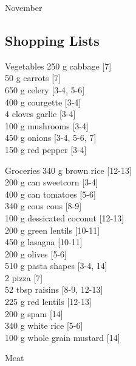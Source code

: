 \begin{menu}{November}
    \subsection*{Shopping Lists}
      \begin{shoppinglist}{Vegetables}
      250 g cabbage {\scriptsize[7]}\\
      50 g carrots {\scriptsize[7]}\\
      650 g celery {\scriptsize[3-4, 5-6]}\\
      400 g courgette {\scriptsize[3-4]}\\
      4 cloves garlic {\scriptsize[3-4]}\\
      100 g mushrooms {\scriptsize[3-4]}\\
      450 g onions {\scriptsize[3-4, 5-6, 7]}\\
      150 g red pepper {\scriptsize[3-4]}\\
      \end{shoppinglist}%
      \begin{shoppinglist}{Groceries}
      340 g brown rice {\scriptsize[12-13]}\\
      200 g can sweetcorn {\scriptsize[3-4]}\\
      400 g can tomatoes {\scriptsize[5-6]}\\
      340 g cous cous {\scriptsize[8-9]}\\
      100 g dessicated coconut {\scriptsize[12-13]}\\
      200 g green lentils {\scriptsize[10-11]}\\
      450 g lasagna {\scriptsize[10-11]}\\
      200 g olives {\scriptsize[5-6]}\\
      510 g pasta shapes {\scriptsize[3-4, 14]}\\
      2  pizza {\scriptsize[7]}\\
      52 tbsp raisins {\scriptsize[8-9, 12-13]}\\
      225 g red lentils {\scriptsize[12-13]}\\
      200 g spam {\scriptsize[14]}\\
      340 g white rice {\scriptsize[5-6]}\\
      100 g whole grain mustard {\scriptsize[14]}\\
      \end{shoppinglist}%
      \par\vfil %
      \begin{shoppinglist}{Meat}

\end{shoppinglist}
\end{menu}
